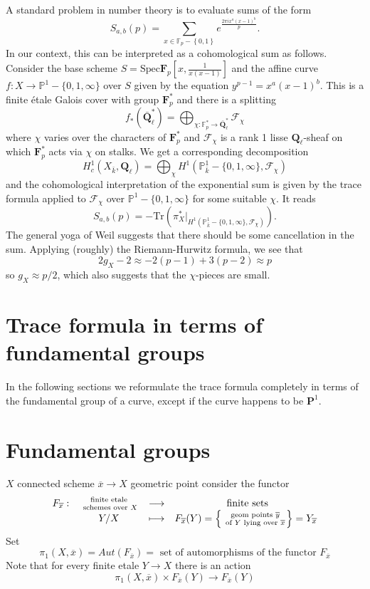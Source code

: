 \noindent
A standard problem in number theory is to evaluate sums of the form
$$
S_{a,b}(p) = \sum_{x\in \mathbb F_p-\left\{0, 1\right\}} e^{\frac{2\pi
ix^a(x-1)^b}{p}}.
$$
In our context, this can be interpreted as a cohomological sum as follows.
Consider the base scheme $S = \text{Spec} \mathbf{F}_p\left[x,
\frac{1}{x(x-1)}\right]$ and the affine curve $f: X \to \mathbb P^1-\{0, 1,
\infty\}$ over $S$ given by the equation $y^{p-1} = x^a(x-1)^b$. This is a
finite \'etale Galois cover with group $\mathbf{F}_p^*$ and there is a splitting
$$
f_*(\bar{\mathbf{Q}}_\ell^*) =
\bigoplus_{\chi : \mathbb F_p^*\to \bar{\mathbf{Q}}_\ell^*} \mathcal{F}_\chi
$$
where $\chi$ varies over the characters of $\mathbf{F}_p^*$ and
$\mathcal{F}_\chi$ is a rank 1 lisse $\mathbf{Q}_\ell$-sheaf on which
$\mathbf{F}_p^*$ acts via $\chi$ on stalks. We get a corresponding decomposition
$$
H_c^1(X_{\bar k}, \mathbf{Q}_\ell) = \bigoplus_\chi H^1(\mathbb P_{\bar
k}^1-\{0, 1, \infty\}, \mathcal{F}_\chi)
$$
and the cohomological interpretation of the exponential sum is given by the
trace formula applied to $\mathcal{F}_\chi$ over $\mathbb P^1 - \{0, 1,
\infty\}$ for some suitable $\chi$. It reads
$$
S_{a,b}(p) = -\text{Tr}\left(\pi_X^*\big|_{H^1(\mathbb P_{\bar k}^1-\{0, 1,
\infty\}, \mathcal{F}_\chi)}\right).
$$
The general yoga of Weil suggests that there should be some cancellation in the
sum. Applying (roughly) the Riemann-Hurwitz formula, we see that
$$
2g_X-2 \approx -2 (p-1) + 3(p-2) \approx p
$$
so $g_X\approx p/2$, which also suggests that the $\chi$-pieces are small.



\section{Trace formula in terms of fundamental groups}
\label{section-trace-formual-fundamental-group}

\noindent
In the following sections we reformulate the trace formula completely
in terms of the fundamental group of a curve, except if the curve
happens to be $\mathbf{P}^1$.




\section{Fundamental groups}
\label{section-fundamental-groups}

\noindent
$X$ connected scheme $\overline x\to X$ geometric
point consider the functor
$$
\begin{matrix}
F_{\overline x}: &
\text{ finite etale }\atop \text{ schemes over } X &
\longrightarrow & \text{ finite sets} \\
&
Y/X &
\longmapsto &
F_{\overline x}(Y) =
\left\{\text{ geom points }\overline y\atop \text{ of } Y
\text{ lying over }\overline x\right\} = Y_{\overline x}
\end{matrix}
$$
Set
$$
\pi_1(X, \overline x)
=
Aut(F_{\overline x})
=
\text{ set of automorphisms of the functor }F_{\overline x}
$$
Note that for every finite etale $Y \to X$ there is an action
$$
\pi_1(X, \overline x) \times F_{\overline x}(Y) \to F_{\overline x}(Y)
$$

